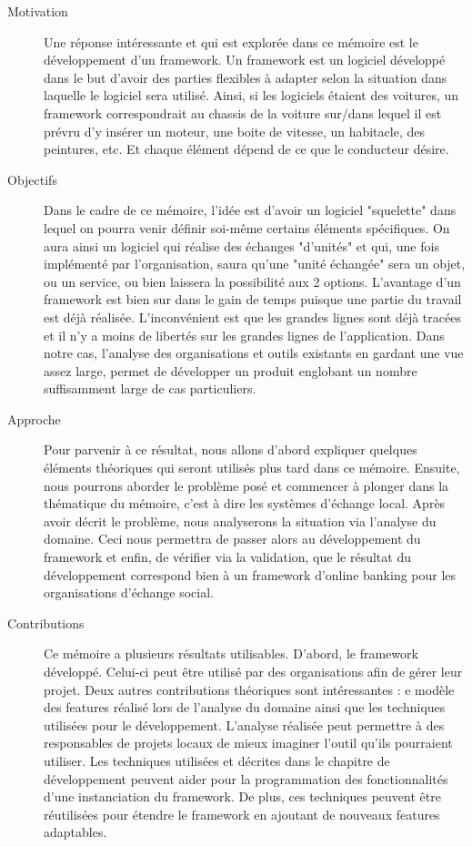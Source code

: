 \begin{description}
\item[Motivation] 
Une réponse intéressante et qui est explorée dans ce mémoire est le développement d'un framework.  Un framework est un logiciel développé dans le but d'avoir des parties flexibles à adapter selon la situation dans laquelle le logiciel sera utilisé.  Ainsi,  si les logiciels étaient des voitures,  un framework correspondrait au chassis de la voiture sur/dans lequel il est prévru d'y insérer un moteur,  une boite de vitesse,  un habitacle,  des peintures,  etc.  Et chaque élément dépend de ce que le conducteur désire.  

\item[Objectifs] 
Dans le cadre de ce mémoire,  l'idée est d'avoir un logiciel "squelette" dans lequel on pourra venir définir soi-même certains éléments spécifiques.   On aura ainsi un logiciel qui réalise des échanges "d'unités" et qui,  une fois implémenté par l'organisation,  saura qu'une "unité échangée" sera un objet,  ou un service,  ou bien laissera la possibilité aux 2 options.  L'avantage d'un framework est bien sur dans le gain de temps puisque une partie du travail est déjà réalisée.  L'inconvénient est que les grandes lignes sont déjà tracées et il n'y a moins de libertés sur les grandes lignes de l'application.  Dans notre cas,  l'analyse des organisations et outils existants en gardant une vue assez large,  permet de développer un produit englobant un nombre suffisamment large de cas particuliers.  

\item[Approche]
Pour parvenir à ce résultat,  nous allons d'abord expliquer quelques éléments théoriques qui seront utilisés plus tard dans ce mémoire.  Ensuite,  nous pourrons aborder le problème posé et commencer à plonger dans la thématique du mémoire,  c'est à dire les systèmes d'échange local.  Après avoir décrit le problème,  nous analyserons la situation via l'analyse du domaine.  Ceci nous permettra de passer alors au développement du framework et enfin,  de vérifier via la validation,  que le résultat du développement correspond bien à un framework d'online banking pour les organisations d'échange social.

\item[Contributions]

Ce mémoire a plusieurs résultats utilisables.  D'abord,  le framework développé.  Celui-ci peut être utilisé par des organisations afin de gérer leur projet.  Deux autres contributions théoriques sont intéressantes : e modèle des features réalisé lors de l'analyse du domaine ainsi que les techniques utilisées pour le développement.  L'analyse réalisée peut permettre à des responsables de projets locaux de mieux imaginer l'outil qu'ils pourraient utiliser.  Les techniques utilisées et décrites dans le chapitre de développement peuvent aider pour la programmation des fonctionnalités d'une instanciation du framework.  De plus,  ces techniques peuvent être réutilisées pour étendre le framework en ajoutant de nouveaux features adaptables.


\end{description}
